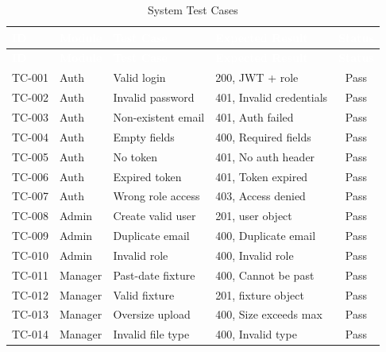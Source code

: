 \documentclass[12pt,a4paper,oneside]{report}
\begin{document}
\begin{longtable}{|l|l|p{4.5cm}|p{4.5cm}|c|}
\caption{System Test Cases}
\label{tab:testcases} \\
\hline
\rowcolor{tableHeader}
\textcolor{white}{\textbf{ID}} & \textcolor{white}{\textbf{Module}} & \textcolor{white}{\textbf{Test Case}} & \textcolor{white}{\textbf{Expected Result}} & \textcolor{white}{\textbf{Status}} \\
\hline
\endfirsthead
\hline
\rowcolor{tableHeader}
\textcolor{white}{\textbf{ID}} & \textcolor{white}{\textbf{Module}} & \textcolor{white}{\textbf{Test Case}} & \textcolor{white}{\textbf{Expected Result}} & \textcolor{white}{\textbf{Status}} \\
\hline
\endhead
TC-001 & Auth    & Valid login          & 200, JWT + role            & Pass \\
\hline\rowcolor{tableRow}
TC-002 & Auth    & Invalid password     & 401, Invalid credentials   & Pass \\
\hline
TC-003 & Auth    & Non-existent email   & 401, Auth failed           & Pass \\
\hline\rowcolor{tableRow}
TC-004 & Auth    & Empty fields         & 400, Required fields       & Pass \\
\hline
TC-005 & Auth    & No token             & 401, No auth header        & Pass \\
\hline\rowcolor{tableRow}
TC-006 & Auth    & Expired token        & 401, Token expired         & Pass \\
\hline
TC-007 & Auth    & Wrong role access    & 403, Access denied         & Pass \\
\hline\rowcolor{tableRow}
TC-008 & Admin   & Create valid user    & 201, user object           & Pass \\
\hline
TC-009 & Admin   & Duplicate email      & 400, Duplicate email       & Pass \\
\hline\rowcolor{tableRow}
TC-010 & Admin   & Invalid role         & 400, Invalid role          & Pass \\
\hline
TC-011 & Manager & Past-date fixture    & 400, Cannot be past        & Pass \\
\hline\rowcolor{tableRow}
TC-012 & Manager & Valid fixture        & 201, fixture object        & Pass \\
\hline
TC-013 & Manager & Oversize upload      & 400, Size exceeds max      & Pass \\
\hline\rowcolor{tableRow}
TC-014 & Manager & Invalid file type    & 400, Invalid type          & Pass \\

\end{longtable}
\end{document}
